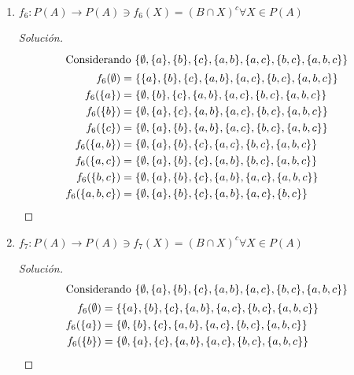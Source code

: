 \documentclass[a4paper,12pt]{article}
\newenvironment{solution}
  {\renewcommand\qedsymbol{$\blacksquare$}\begin{proof}[Solución]}
  {\end{proof}}
\begin{document}
\begin{enumerate}
\begin{solution}
\begin{align}
    f_5(\{a\}) &=\{a\} \\
    f_5(\{b\}) &= \{b\}\\
    f_5(\{c\}) &= \emptyset\\
    f_5(\{a, b\}) &= \{a,b\}\\
    f_5(\{a, c\}) &= \{a\}\\
    f_5(\{b, c\}) &= \{b\}\\
    f_5(\{a, b, c\}) &=\{a,b\}\\
\end{align}
\end{solution}
\item $f_6: P(A)\to P(A)\ni f_6(X)=(B\cap X)^c\forall X\in P(A) $
\begin{solution}
\begin{align}
\intertext{Considerando $\{\emptyset,\{a\},\{b\},\{c\},\{a, b\},\{a, c\},\{b, c\},\{a, b, c\}\} $}
    f_6(\emptyset) &= \{\{a\},\{b\},\{c\},\{a, b\},\{a, c\},\{b, c\},\{a, b, c\}\} \\
    f_6(\{a\}) &=\{\emptyset,\{b\},\{c\},\{a, b\},\{a, c\},\{b, c\},\{a, b, c\}\} \\
    f_6(\{b\}) &= \{\emptyset,\{a\},\{c\},\{a, b\},\{a, c\},\{b, c\},\{a, b, c\}\} \\
    f_6(\{c\}) &= \{\emptyset,\{a\},\{b\},\{a, b\},\{a, c\},\{b, c\},\{a, b, c\}\}\\
    f_6(\{a, b\}) &= \{\emptyset,\{a\},\{b\},\{c\},\{a, c\},\{b, c\},\{a, b, c\}\}\\
    f_6(\{a, c\}) &=  \{\emptyset,\{a\},\{b\},\{c\},\{a, b\},\{b, c\},\{a, b, c\}\}\\
    f_6(\{b, c\}) &=  \{\emptyset,\{a\},\{b\},\{c\},\{a, b\},\{a, c\},\{a, b, c\}\}\\
    f_6(\{a, b, c\}) &=\{\emptyset,\{a\},\{b\},\{c\},\{a, b\},\{a, c\},\{b, c\}\}\\
\end{align}
\end{solution}
\item $f_7: P(A)\to P(A)\ni f_7(X)=(B\cap X)^c\forall X\in P(A) $
\begin{solution}
\begin{align}
\intertext{Considerando $\{\emptyset,\{a\},\{b\},\{c\},\{a, b\},\{a, c\},\{b, c\},\{a, b, c\}\} $}
    f_6(\emptyset) &= \{\{a\},\{b\},\{c\},\{a, b\},\{a, c\},\{b, c\},\{a, b, c\}\} \\
    f_6(\{a\}) &=\{\emptyset,\{b\},\{c\},\{a, b\},\{a, c\},\{b, c\},\{a, b, c\}\} \\
    f_6(\{b\}) &= \{\emptyset,\{a\},\{c\},\{a, b\},\{a, c\},\{b, c\},\{a, b, c\}\} \\

\end{align}
\end{solution}
\end{enumerate}
\end{document}
